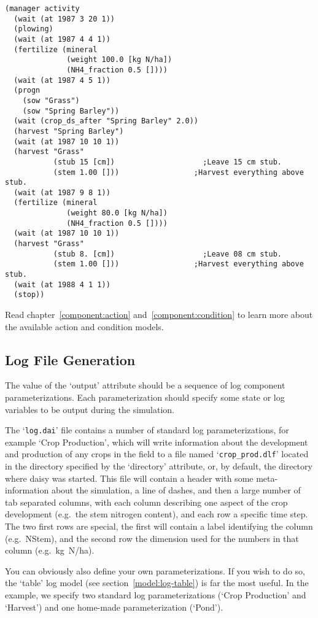 \begin{verbatim}
(manager activity
  (wait (at 1987 3 20 1))
  (plowing)
  (wait (at 1987 4 4 1))
  (fertilize (mineral 
              (weight 100.0 [kg N/ha])
              (NH4_fraction 0.5 [])))
  (wait (at 1987 4 5 1))
  (progn 
    (sow "Grass")
    (sow "Spring Barley"))
  (wait (crop_ds_after "Spring Barley" 2.0))
  (harvest "Spring Barley")
  (wait (at 1987 10 10 1))
  (harvest "Grass"
           (stub 15 [cm])                    ;Leave 15 cm stub.
           (stem 1.00 []))                 ;Harvest everything above stub.
  (wait (at 1987 9 8 1))
  (fertilize (mineral
              (weight 80.0 [kg N/ha])
              (NH4_fraction 0.5 [])))
  (wait (at 1987 10 10 1))
  (harvest "Grass"
           (stub 8. [cm])                    ;Leave 08 cm stub.
           (stem 1.00 []))                 ;Harvest everything above stub.
  (wait (at 1988 4 1 1))
  (stop))
\end{verbatim}

Read chapter~\ref{component:action} and~\ref{component:condition} to
learn more about the available action and condition models.

\subsection{Log File Generation}

The value of the `output' attribute should be a sequence of log
component parameterizations.  Each parameterization should specify
some state or log variables to be output during the simulation.

The `\texttt{log.dai}' file contains a number of standard log
parameterizations, for example `Crop Production', which will write
information about the development and production of any crops in the
field to a file named `\texttt{crop\_prod.dlf}' located in the
directory specified by the `directory' attribute, or, by default, the
directory where daisy was started.  This file will contain a header
with some meta-information about the simulation, a line of dashes, and
then a large number of tab separated columns, with each column
describing one aspect of the crop development (e.g.\ the stem nitrogen
content), and each row a specific time step.  The two first rows are
special, the first will contain a label identifying the column (e.g.\ 
NStem), and the second row the dimension used for the numbers in that
column (e.g.\ kg~N/ha).

You can obviously also define your own parameterizations.  If you wish
to do so, the `table' log model (see section~\ref{model:log-table})
is far the most useful.  In the example, we specify two standard log
parameterizations (`Crop Production' and `Harvest') and one home-made
parameterization (`Pond').

